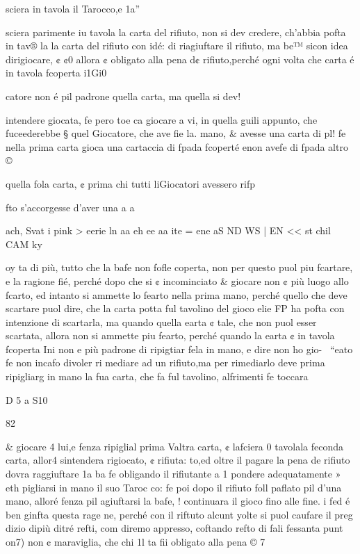 \documentclass[12pt,a6paper]{article}
\begin{document}
sciera in tavola il Tarocco,e 1a”

sciera parimente iu tavola la
carta del rifiuto, non si dev
credere, ch’abbia pofta in tav®
la la carta del rifiuto con idé:
di riagiuftare il rifiuto, ma be™
sicon idea dirigiocare, ¢ ¢0%
allora ¢ obligato alla pena d¢
rifiuto,perché ogni volta che
carta é in tavola fcoperta i1Gi0

catore non é pil padrone
quella carta, ma quella si dev!

intendere giocata, fe pero toe
ca giocare a vi, in quella guili
appunto, che fuceederebbe §
quel Giocatore, che ave fie la.
mano, & avesse una carta di pl!
fe nella prima carta gioca
una cartaccia di fpada fcoperté
enon avefe di fpada altro ©

quella fola carta, ¢ prima chi
tutti liGiocatori avessero rifp

fto s’accorgesse d’aver una a
a

 
 

ach, Svat i pink > eerie ln aa eh ee aa ite = ene aS ND WS | EN << st chil CAM ky

oy
ta di più, tutto che la bafe non
fofle coperta, non per questo
puol piu fcartare, e la ragione
fié, perché dopo che si ¢ incominciato & giocare non ¢ più
luogo allo fcarto, ed intanto si
ammette lo fearto nella prima
mano, perché quello che deve
scartare puol dire, che la carta
potta ful tavolino del gioco elie
FP ha pofta con intenzione di
scartarla, ma quando quella
earta ¢ tale, che non puol esser
scartata, allora non si ammette
piu fearto, perché quando la
earta ¢ in tavola fcoperta Ini
non e più padrone di ripigtiar
fela in mano, e dire non ho gio-~
“eato fe non incafo divoler ri
mediare ad un rifiuto,ma per rimediarlo deve prima ripigliarg
in mano la fua carta, che fa ful
tavolino, alfrimenti fe toccara

D 5 a S10

 

 

 
 

 

 

 

 

82

& giocare 4 lui,e fenza ripiglial
prima Valtra carta, ¢ lafciera 0
tavolala feconda carta, allor4
sintendera rigiocato, ¢ rifiuta:
to,ed oltre il pagare la pena de
rifiuto dovra raggiuftare 1a ba
fe obligando il rifiutante a 1%
pondere adequatamente » eth
pigliarsi in mano il suo Taroc
co: fe poi dopo il rifiuto foll
paflato pil d’una mano, alloré
fenza pil agiuftarsi la bafe, !
continuara il gioco fino alle
fine. i
fed é ben ginfta questa rage
ne, perché con il riftuto alcunt
yolte si puol caufare il preg
dizio dipiù ditré refti, com
diremo appresso, coftando
refto di fali fessanta punt on7)
non ¢ maraviglia, che chi 1l
ta fii obligato alla pena © 7
\end{document}

